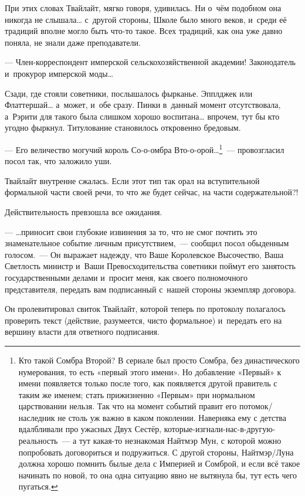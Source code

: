 \documentclass[twoside,a5paper,12pt]{extbook}
\begin{document}
При этих словах Твайлайт, мягко говоря, удивилась. Ни о чём подобном она никогда не слышала… с другой стороны, Школе было много веков, и среди её традиций вполне могло быть что-то такое. Всех традиций, как она уже давно поняла, не знали даже преподаватели.

— Член-корреспондент имперской сельскохозяйственной академии! Законодатель и прокурор имперской моды…

Сзади, где стояли советники, послышалось фырканье. Эпплджек или Флаттершай… а может, и обе сразу. Пинки в данный момент отсутствовала, а Рэрити для такого была слишком хорошо воспитана… впрочем, тут бы кто угодно фыркнул. Титулование становилось откровенно бредовым.

— Его величество могучий король Со-о-омбра Вто-о-орой…\footnote{
Кто такой Сомбра Второй? В сериале был просто Сомбра, без династического нумерования, то есть «первый этого имени». Но добавление «Первый» к имени появляется только после того, как появляется другой правитель с таким же именем; стать прижизненно «Первым» при нормальном царствовании нельзя. Так что на момент событий правит его потомок/наследник не столь уж важно в каком поколении. Наверняка ему с детства вдалбливали про ужасных Двух Сестёр, которые-изгнали-нас-в-другую-реальность — а тут какая-то незнакомая Найтмэр Мун, с которой можно попробовать договориться и подружиться. С другой стороны, Найтмэр/Луна должна хорошо помнить былые дела с Империей и Сомброй, и если всё такое начинать по новой, то она одна ситуацию явно не вытянула бы, тут есть чего пугаться.
} — провозгласил посол так, что заложило уши.

Твайлайт внутренне сжалась. Если этот тип так орал на вступительной формальной части своей речи, то что же будет сейчас, на части содержательной?!

Действительность превзошла все ожидания.

— …приносит свои глубокие извинения за то, что не смог почтить это знаменательное событие личным присутствием, — сообщил посол обыденным голосом. — Он выражает надежду, что Ваше Королевское Высочество, Ваша Светлость министр и Ваши Превосходительства советники поймут его занятость государственными делами и просит меня, как своего полномочного представителя, передать вам подписанный с нашей стороны экземпляр договора.

Он пролевитировал свиток Твайлайт, которой теперь по протоколу полагалось проверить текст (действие, разумеется, чисто формальное) и передать его на вершину власти для ответного подписания.
\end{document}
